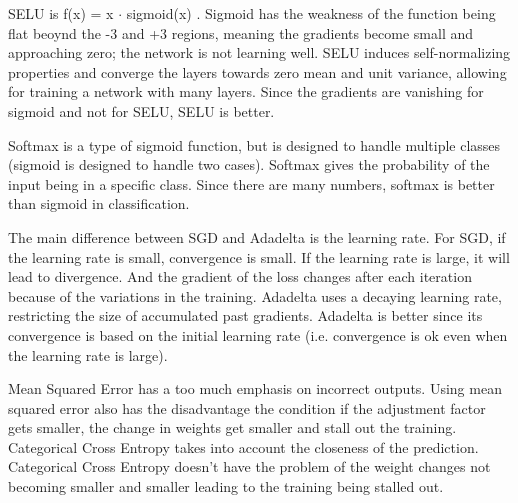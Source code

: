 \documentclass[11pt]{article}
\begin{document}
\noindent
SELU is f(x) = x $\cdot$ sigmoid(x) . Sigmoid has the weakness of the function being flat beoynd the -3 and +3 regions, meaning the gradients become small and approaching zero; the network is not learning well. SELU induces self-normalizing properties and converge the layers towards zero mean and unit variance, allowing for training a network with many layers. Since the gradients are vanishing for sigmoid and not for SELU, SELU is better. 

\noindent
Softmax is a type of sigmoid function, but is designed to handle multiple classes (sigmoid is designed to handle two cases). Softmax gives the probability of the input being in a specific class. Since there are many numbers, softmax is better than sigmoid in classification.

\noindent
The main difference between SGD and Adadelta is the learning rate. For SGD, if the learning rate is small, convergence is small. If the learning rate is large, it will lead to divergence. And the gradient of the loss changes after each iteration because of the variations in the training. Adadelta uses a decaying learning rate, restricting the size of accumulated past gradients. Adadelta is better since its convergence is based on the initial learning rate (i.e. convergence is ok even when the learning rate is large).

\noindent
Mean Squared Error has a too much emphasis on incorrect outputs. Using mean squared error also has the disadvantage the condition if the adjustment factor gets smaller, the change in weights get smaller and stall out the training. Categorical Cross Entropy takes into account the closeness of the prediction. Categorical Cross Entropy doesn't have the problem of the weight changes not becoming smaller and smaller leading to the training being stalled out.
\end{document}
